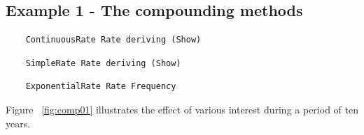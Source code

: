 \documentclass[11pt,a4paper]{article}
\numberwithin{equation}{section}
\begin{document}
	\begin{minipage}{\linewidth}
	\label{fig:comp01}
	\end{minipage}

	\subsection{Example 1 - The compounding methods}
	\FrameSep
	\begin{lstlisting}
	ContinuousRate Rate deriving (Show)
	\end{lstlisting}
	\FrameSep
	\begin{lstlisting}
	SimpleRate Rate deriving (Show)
	\end{lstlisting}
	\FrameSep
	\begin{lstlisting}
	ExponentialRate Rate Frequency
	\end{lstlisting}

	Figure ~\ref{fig:comp01} illustrates the effect of various interest during a period of ten years.

	\begin{minipage}{\linewidth}
	\label{fig:comp01}
	\end{minipage}
\end{document}
